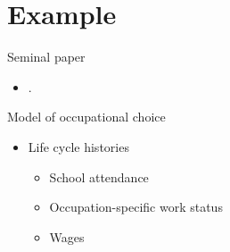 \section{Example}
\begin{frame}{Seminal paper}\vspace{0.25cm}
\begin{itemize}
	\item {}.
\end{itemize}
\end{frame}
\begin{frame}{Model of occupational choice}\vspace{0.25cm}

\begin{itemize}\setlength\itemsep{1em}
\item Life cycle histories\medskip
\begin{itemize}\setlength\itemsep{1em}
\item School attendance
\item Occupation-specific work status
\item Wages
\end{itemize}
\end{itemize}
\end{frame}


